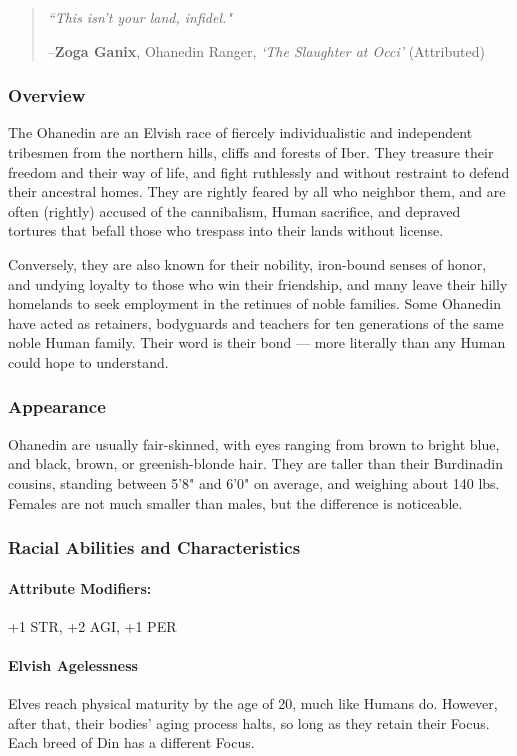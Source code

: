 \documentclass[oneside,11pt,english]{book}
\begin{document}
\begin{quote}
\emph{``This isn't your land, infidel."} 

\hfill--\textbf{Zoga Ganix}, Ohanedin Ranger, \textit{‘The Slaughter at Occi’} (Attributed) 
\end{quote}
\subsubsection*{Overview} 
The Ohanedin are an Elvish race of fiercely individualistic and independent tribesmen from the northern 
hills, cliffs and forests of Iber. They treasure their freedom and their way of life, and fight ruthlessly and 
without restraint to defend their ancestral homes. They are rightly feared by all who neighbor them, and 
are often (rightly) accused of the cannibalism, Human sacrifice, and depraved tortures that befall those 
who trespass into their lands without license. 


Conversely, they are also known for their nobility, iron-bound senses of honor, and undying loyalty to those who win their friendship, and many leave their hilly homelands to seek employment in the retinues of noble families. Some Ohanedin have acted as retainers, bodyguards and teachers for ten generations of the same noble Human family. Their word is their bond — more literally than any Human could hope to understand. 
\subsubsection*{Appearance} 
Ohanedin are usually fair-skinned, with eyes ranging from brown to bright blue, and black, brown, or 
greenish-blonde hair. They are taller than their Burdinadin cousins, standing between 5'8" and 6'0" on 
average, and weighing about 140 lbs. Females are not much smaller than males, but the difference is 
noticeable. 
\subsubsection*{Racial Abilities and Characteristics} 
\paragraph{Attribute Modifiers:} +1 STR, +2 AGI, +1 PER 
\paragraph{Elvish Agelessness}
Elves reach physical maturity by the age of 20, much like Humans do. However, after that, their bodies' aging process halts, so long as they retain their Focus. Each breed of Din has a different Focus. 
\end{document}
